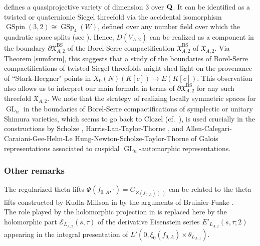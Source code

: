 \documentclass{amsart}
\theoremstyle{definition}
\begin{document}
defines a quasiprojective variety of dimension $3$ over ${\bf{Q}}$. 
It can be identified as a twisted or quaternionic Siegel threefold via the accidental isomorphism $\operatorname{GSpin}(3,2) \cong \operatorname{GSp}_4(W)$,
defined over any number field over which the quadratic space splits (see \cite[Appendix A]{KuRa}). 
Hence, $D(V_{A, 2})$ can be realized as a component in the boundary $\partial \mathfrak{X}_{A, 2}^{\operatorname{BS}}$ 
of the Borel-Serre compactification $\mathfrak{X}_{A, 2}^{\operatorname{BS}}$ of $\mathfrak{X}_{A,2}$. 
Via Theorem \ref{sumform}, this suggests that a study of the boundaries of Borel-Serre compactifications of twisted Siegel threefolds  
might shed light on the provenance of ``Stark-Heegner" points in $X_0(N)(K[c]) \rightarrow E(K[c])$. 
This observation also allows us to interpret our main formula in terms of $\partial \mathfrak{X}_{A, 2}^{\operatorname{BS}}$ for any such threefold $\mathfrak{X}_{A,2}$. 
We note that the strategy of realizing locally symmetric spaces for $\operatorname{GL}_n$ in the boundaries of Borel-Serre compactifications of symplectic or unitary Shimura varieties, 
which seems to go back to Clozel (cf.~\cite{Cl20}), is used crucially in the constructions by Scholze \cite{Sch15}, Harris-Lan-Taylor-Thorne \cite{HLTT}, 
and Allen-Calegari-Caraiani-Gee-Helm-Le Hung-Newton-Scholze-Taylor-Thorne
\cite{ACC} of Galois representations associated to cuspidal $\operatorname{GL}_n$-automorphic representations. 

\subsubsection{Other remarks}\label{remark} 

 The regularized theta lifts $\Phi(f_{0, A}, \cdot) = G_{Z(f_{0, A})(\cdot)}$ can be related to the theta lifts 
constructed by Kudla-Millson in \cite{KM} by the arguments of Bruinier-Funke \cite[Theorems 1.4 and 1.5]{BF}. \\

 The role played by the holomorphic projection in \cite{GZ} is replaced here by the holomorphic part 
$\mathcal{E}_{L_{A,2}}(s, \tau)$ of the derivative Eisenstein series $E'_{L_{A,2}}(s, \tau; 2)$ appearing in the integral presentation of $L'(0, \xi_0(f_{0, A}) \times \theta_{L_{A,1}})$. \\
\end{document}
